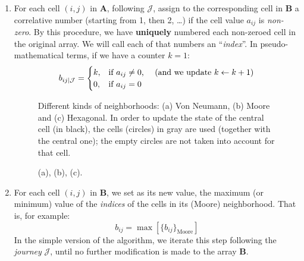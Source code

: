 \begin{enumerate}
  
\item For each cell $(i,j)$ in $\mathbf{A}$, following $\mathcal{J}$,
  assign to the corresponding cell in $\mathbf{B}$ a correlative
  number (starting from 1, then 2, \ldots) if the cell value $a_{ij}$
  is \emph{non-zero}. By this procedure, we have \textbf{uniquely}
  numbered each non-zeroed cell in the original array. We will call
  each of that numbers an ``\emph{index}''. In pseudo-mathematical
  terms, if we have a counter $k=1$:
  \begin{equation}
    \label{eq:islandsalg1}
    b_{ij|\mathcal{J}} = 
    \begin{cases}
      k, & \text{if $a_{ij}\neq 0$, \quad (and we update $k \gets k+1$)}\\
      0, & \text{if $a_{ij}=0$}
    \end{cases}
  \end{equation}
  
\begin{figure}[hbt]
  \centering
  \mbox{}\hfill
  \hfill
  \hfill
  \hfill\mbox{}
  \ifenglish
  \caption[Different kinds of neighborhood]{Different kinds of
    neighborhoods: (a) Von Neumann, (b) Moore and (c) Hexagonal. In
    order to update the state of the central cell (in black), the
    cells (circles) in gray are used (together with the central one);
    the empty circles are not taken into account for that cell.}
  \else
  \caption[]{(a), (b), (c).}  \fi
  \label{fig:neighborhood}
\end{figure}

\item For each cell $(i,j)$ in $\mathbf{B}$, we set as its new value,
  the maximum (or minimum) value of the \emph{indices} of the cells in
  its (Moore) neighborhood. That is, for example:
  \begin{equation}
    \label{eq:islandsalg2}
    b_{ij} = \max[\{b_{ij}\}_{\text{Moore}}]
  \end{equation}
  In the simple version of the algorithm, we iterate this step
  following the \emph{journey} $\mathcal{J}$, until no further
  modification is made to the array $\mathbf{B}$.
  

\end{enumerate}
